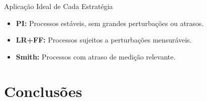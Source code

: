 \documentclass{beamer}
\begin{document}
\begin{frame}{Aplicação Ideal de Cada Estratégia}
    \begin{itemize}
        \item \textbf{PI:} Processos estáveis, sem grandes perturbações ou atrasos.
        \item \textbf{LR+FF:} Processos sujeitos a perturbações mensuráveis.
        \item \textbf{Smith:} Processos com atraso de medição relevante.
    \end{itemize}
\end{frame}

\section{Conclusões}
\end{document}

